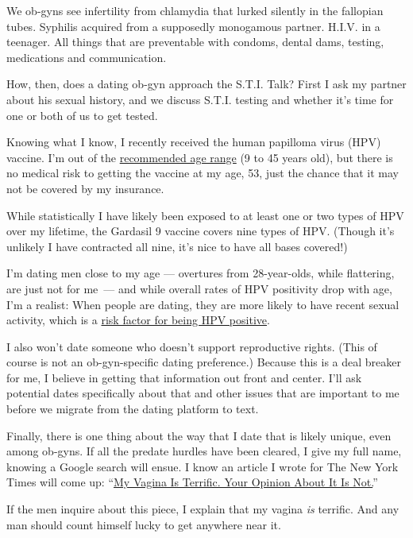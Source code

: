 We ob-gyns see infertility from chlamydia that lurked silently in the
fallopian tubes. Syphilis acquired from a supposedly monogamous partner.
H.I.V. in a teenager. All things that are preventable with condoms,
dental dams, testing, medications and communication.

How, then, does a dating ob-gyn approach the S.T.I. Talk? First I ask my
partner about his sexual history, and we discuss S.T.I. testing and
whether it's time for one or both of us to get tested.

Knowing what I know, I recently received the human papilloma virus (HPV)
vaccine. I'm out of the
\href{https://www.nytimes3xbfgragh.onion/2019/04/30/well/when-is-hpv-a-problem.html}{recommended
age range} (9 to 45 years old), but there is no medical risk to getting
the vaccine at my age, 53, just the chance that it may not be covered by
my insurance.

While statistically I have likely been exposed to at least one or two
types of HPV over my lifetime, the Gardasil 9 vaccine covers nine types
of HPV. (Though it's unlikely I have contracted all nine, it's nice to
have all bases covered!)

I'm dating men close to my age --- overtures from 28-year-olds, while
flattering, are just not for me~--- and while overall rates of HPV
positivity drop with age, I'm a realist: When people are dating, they
are more likely to have recent sexual activity, which is a
\href{https://sti.bmj.com/content/78/3/215}{risk factor for being HPV
positive}.

I also won't date someone who doesn't support reproductive rights. (This
of course is not an ob-gyn-specific dating preference.) Because this is
a deal breaker for me, I believe in getting that information out front
and center. I'll ask potential dates specifically about that and other
issues that are important to me before we migrate from the dating
platform to text.

Finally, there is one thing about the way that I date that is likely
unique, even among ob-gyns. If all the predate hurdles have been
cleared, I give my full name, knowing a Google search will ensue. I know
an article I wrote for The New York Times will come up:
``\href{https://www.nytimes3xbfgragh.onion/2017/11/16/style/my-vagina-is-terrific-your-opinion-about-it-is-not.html}{My
Vagina Is Terrific. Your Opinion About It Is Not.}''

If the men inquire about this piece, I explain that my vagina \emph{is}
terrific. And any man should count himself lucky to get anywhere near
it.

